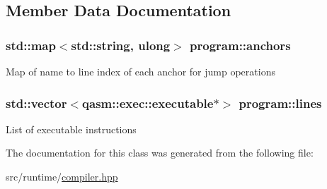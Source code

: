 \subsection{Member Data Documentation}
\subsubsection[{\texorpdfstring{anchors}{anchors}}]{\setlength{\rightskip}{0pt plus 5cm}std\+::map$<$std\+::string, {\bf ulong}$>$ program\+::anchors}\hypertarget{classprogram_ae17b7e99958aa0770b1cc4a8c20acbfe}{}\label{classprogram_ae17b7e99958aa0770b1cc4a8c20acbfe}
Map of name to line index of each anchor for jump operations 
\subsubsection[{\texorpdfstring{lines}{lines}}]{\setlength{\rightskip}{0pt plus 5cm}std\+::vector$<${\bf qasm\+::exec\+::executable}$\ast$$>$ program\+::lines}\hypertarget{classprogram_a827f0b22e21be3ce1e0e568a147488b9}{}\label{classprogram_a827f0b22e21be3ce1e0e568a147488b9}
List of executable instructions 

The documentation for this class was generated from the following file\+:\begin{DoxyCompactItemize}
\item 
src/runtime/\hyperlink{compiler_8hpp}{compiler.\+hpp}\end{DoxyCompactItemize}
